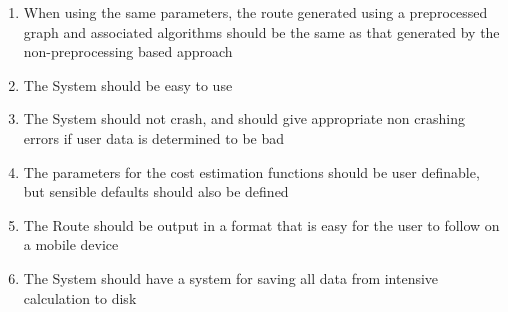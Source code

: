 \documentclass[11pt,twoside,a4paper]{article}
\begin{document}
\begin{enumerate}
\begin{enumerate}[label=\arabic{enumi}.\arabic*]
    \item When using the same parameters, the route generated using a preprocessed graph and associated algorithms should be the same as that generated by the non-preprocessing based approach
    \item The System should be easy to use
    \item \label{nocrashy} The System should not crash, and should give appropriate non crashing errors if user data is determined to be bad
    \item The parameters for the cost estimation functions should be user definable, but sensible defaults should also be defined
    \item The Route should be output in a format that is easy for the user to follow on a mobile device
    \item The System should have a system for saving all data from intensive calculation to disk
\end{enumerate}
\end{enumerate}
\newpage
\end{document}
